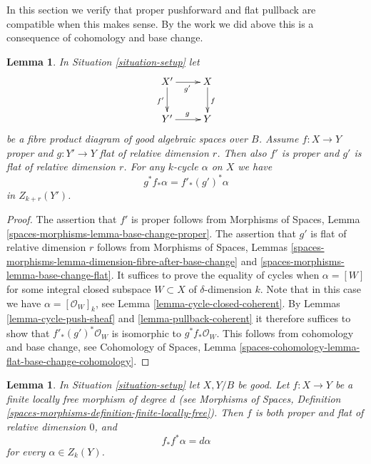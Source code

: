 \documentclass{stacks-project}
\theoremstyle{plain}
\newtheorem{lemma}[subsection]{Lemma}
\theoremstyle{definition}
\theoremstyle{remark}
\numberwithin{equation}{subsection}
\begin{document}
\medskip\noindent
In this section we verify that proper pushforward and flat pullback
are compatible when this makes sense. By the work we did above this
is a consequence of cohomology and base change.

\begin{lemma}
\label{lemma-flat-pullback-proper-pushforward}
In Situation \ref{situation-setup} let
$$
\xymatrix{
X' \ar[r]_{g'} \ar[d]_{f'} & X \ar[d]^f \\
Y' \ar[r]^g & Y
}
$$
be a fibre product diagram of good algebraic spaces over $B$.
Assume $f : X \to Y$ proper and $g : Y' \to Y$ flat of relative dimension $r$.
Then also $f'$ is proper and $g'$ is flat of relative dimension $r$.
For any $k$-cycle $\alpha$ on $X$ we have
$$
g^*f_*\alpha = f'_*(g')^*\alpha
$$
in $Z_{k + r}(Y')$.
\end{lemma}

\begin{proof}
The assertion that $f'$ is proper follows from
Morphisms of Spaces, Lemma \ref{spaces-morphisms-lemma-base-change-proper}.
The assertion that $g'$ is flat of relative dimension $r$ follows from
Morphisms of Spaces, Lemmas
\ref{spaces-morphisms-lemma-dimension-fibre-after-base-change}
and \ref{spaces-morphisms-lemma-base-change-flat}.
It suffices to prove the equality of cycles when $\alpha = [W]$
for some integral closed subspace $W \subset X$ of $\delta$-dimension $k$.
Note that in this case we have $\alpha = [\mathcal{O}_W]_k$, see
Lemma \ref{lemma-cycle-closed-coherent}.
By Lemmas \ref{lemma-cycle-push-sheaf} and
\ref{lemma-pullback-coherent} it therefore suffices
to show that $f'_*(g')^*\mathcal{O}_W$ is isomorphic to
$g^*f_*\mathcal{O}_W$. This follows from cohomology and
base change, see Cohomology of Spaces, Lemma
\ref{spaces-cohomology-lemma-flat-base-change-cohomology}.
\end{proof}

\begin{lemma}
\label{lemma-finite-flat}
In Situation \ref{situation-setup} let $X, Y/B$ be good.
Let $f : X \to Y$ be a finite locally free morphism
of degree $d$ (see
Morphisms of Spaces, Definition
\ref{spaces-morphisms-definition-finite-locally-free}).
Then $f$ is both proper and flat of relative dimension $0$, and
$$
f_*f^*\alpha = d\alpha
$$
for every $\alpha \in Z_k(Y)$.
\end{lemma}
\end{document}
